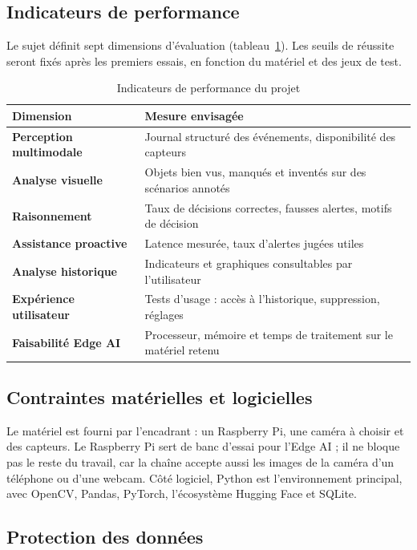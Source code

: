 \subsection{Indicateurs de performance}

Le sujet définit sept dimensions d'évaluation (tableau~\ref{tab:kpi}). Les seuils de réussite seront fixés après
les premiers essais, en fonction du matériel et des jeux de test.

\begin{table}[H]
  \centering
  \small
  \begin{tabularx}{\linewidth}{>{\bfseries}p{4.2cm}X}
    \toprule
    Dimension & Mesure envisagée \\
    \midrule
    Perception multimodale & Journal structuré des événements, disponibilité des capteurs \\
    Analyse visuelle & Objets bien vus, manqués et inventés sur des scénarios annotés \\
    Raisonnement & Taux de décisions correctes, fausses alertes, motifs de décision \\
    Assistance proactive & Latence mesurée, taux d'alertes jugées utiles \\
    Analyse historique & Indicateurs et graphiques consultables par l'utilisateur \\
    Expérience utilisateur & Tests d'usage : accès à l'historique, suppression, réglages \\
    Faisabilité Edge AI & Processeur, mémoire et temps de traitement sur le matériel retenu \\
    \bottomrule
  \end{tabularx}
  \caption{Indicateurs de performance du projet}
  \label{tab:kpi}
\end{table}

\subsection{Contraintes matérielles et logicielles}

Le matériel est fourni par l'encadrant : un Raspberry Pi, une caméra à choisir et des capteurs. Le Raspberry Pi
sert de banc d'essai pour l'Edge AI ; il ne bloque pas le reste du travail, car la chaîne accepte aussi les images
de la caméra d'un téléphone ou d'une webcam. Côté logiciel, Python est l'environnement principal, avec OpenCV,
Pandas, PyTorch, l'écosystème Hugging Face et SQLite.

\subsection{Protection des données}

